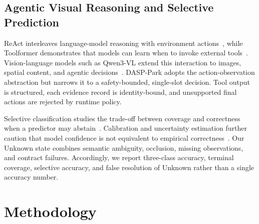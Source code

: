 \documentclass[conference]{IEEEtran}
\begin{document}
\subsection{Agentic Visual Reasoning and Selective Prediction}
ReAct interleaves language-model reasoning with environment actions~\cite{react2023}, while Toolformer demonstrates that models can learn when to invoke external tools~\cite{toolformer2023}. Vision-language models such as Qwen3-VL extend this interaction to images, spatial content, and agentic decisions~\cite{qwen3vl2025}. DASP-Park adopts the action-observation abstraction but narrows it to a safety-bounded, single-slot decision. Tool output is structured, each evidence record is identity-bound, and unsupported final actions are rejected by runtime policy.

Selective classification studies the trade-off between coverage and correctness when a predictor may abstain~\cite{geifman2017selective}. Calibration and uncertainty estimation further caution that model confidence is not equivalent to empirical correctness~\cite{guo2017calibration,kendall2017uncertainty}. Our Unknown state combines semantic ambiguity, occlusion, missing observations, and contract failures. Accordingly, we report three-class accuracy, terminal coverage, selective accuracy, and false resolution of Unknown rather than a single accuracy number.

\begin{table}[t]
\centering
\caption{Positioning relative to representative system families.}
\label{tab:related}
\footnotesize
{}
\end{table}

\section{Methodology}
\end{document}
